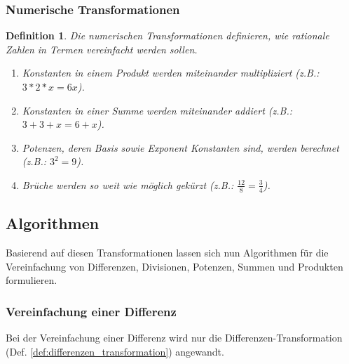 \documentclass[11pt]{article}
\newtheorem{defin}{Definition}
\newcommand{\lab}[1]{(Def. \ref{#1})}
\begin{document}
\subsubsection{Numerische Transformationen}
\begin{defin}
  \label{def:numerische_transformation}
  Die numerischen Transformationen definieren, wie rationale Zahlen in Termen vereinfacht werden sollen.

  \begin{enumerate}
    \item Konstanten in einem Produkt werden miteinander multipliziert (z.B.: $3*2*x = 6x$).
    \item Konstanten in einer Summe werden miteinander addiert (z.B.: $3+3+x = 6+x$).
    \item Potenzen, deren Basis sowie Exponent Konstanten sind, werden berechnet (z.B.: $3^2 = 9$).
    \item Brüche werden so weit wie möglich gekürzt (z.B.: $\frac{12}{8} = \frac{3}{4}$).
  \end{enumerate}
\end{defin}


\subsection{Algorithmen}

Basierend auf diesen Transformationen lassen sich nun Algorithmen für die Vereinfachung von
Differenzen, Divisionen, Potenzen, Summen und Produkten formulieren.

\subsubsection{Vereinfachung einer Differenz}
Bei der Vereinfachung einer Differenz wird nur die Differenzen-Transformation \lab{def:differenzen_transformation}
angewandt.
\end{document}
